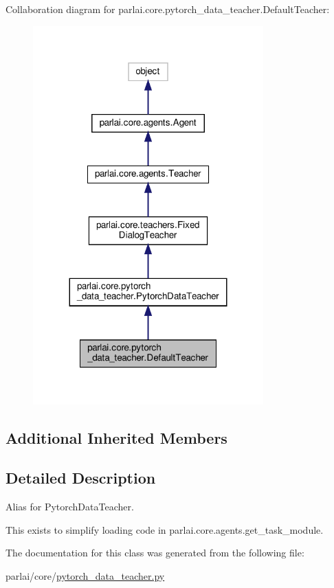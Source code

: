 Collaboration diagram for parlai.\+core.\+pytorch\+\_\+data\+\_\+teacher.\+Default\+Teacher\+:
\nopagebreak
\begin{figure}[H]
\begin{center}
\leavevmode
\includegraphics[width=251pt]{classparlai_1_1core_1_1pytorch__data__teacher_1_1DefaultTeacher__coll__graph}
\end{center}
\end{figure}
\subsection*{Additional Inherited Members}


\subsection{Detailed Description}
\begin{DoxyVerb}Alias for PytorchDataTeacher.

This exists to simplify loading code in parlai.core.agents.get_task_module.
\end{DoxyVerb}
 

The documentation for this class was generated from the following file\+:\begin{DoxyCompactItemize}
\item 
parlai/core/\hyperlink{pytorch__data__teacher_8py}{pytorch\+\_\+data\+\_\+teacher.\+py}\end{DoxyCompactItemize}
